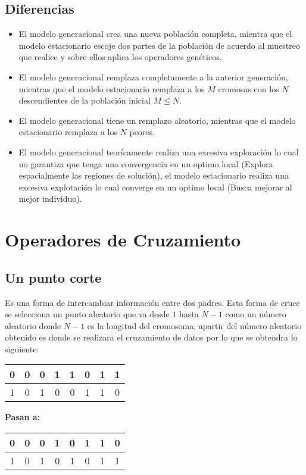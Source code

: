 \documentclass[10pt]{article}
\begin{document}
\subsection{Diferencias}
\begin{itemize}
  \item El modelo generacional crea una nueva población completa, mientra que el modelo estacionario escoje dos partes de la población de acuerdo al muestreo que realice y sobre ellos aplica los operadores genéticos.
  \item El modelo generacional remplaza completamente a la anterior generación, mientras que el modelo estacionario remplaza a los $M$ cromosas con los $N$ descendientes de la población inicial $M\leq N$.
  \item El modelo generacional tiene un remplazo aleatorio, mientras que el modelo estacionario remplaza a los $N$ peores.
  \item El modelo generacional teorícamente realiza una excesiva exploración lo cual no garantiza que tenga una convergencia en un optimo local (Explora espacialmente las regiones de solución), el modelo estacionario realiza una excesiva explotación lo cual converge en un optimo local (Busca mejorar al mejor individuo).
\end{itemize}
\section{Operadores de Cruzamiento}
\subsection{Un punto corte}
Es una forma de intercambiar información entre dos padres. Esta forma de cruce se selecciona un punto aleatorio que va desde $1$ hasta $N-1$ como un número aleatorio donde $N-1$ es la longitud del cromosoma, apartir del número aleatorio obtenido es donde se realizara el cruzamiento de datos por lo que se obtendra lo siguiente:
\begin{center}
  \begin{tabular}{|c|c|c|c|c|c|c|c|}
    \hline
    \color{green}0&\color{green}0&\color{green}0&\color{green}1&\color{blue}1&\color{blue}0&\color{blue}1&\color{blue}1\\
    \hline
    \color{red}1&\color{red}0&\color{red}1&\color{red}0&\color{yellow}0&\color{yellow}1&\color{yellow}1&\color{yellow}0\\
    \hline
  \end{tabular}
  \textbf{Pasan a:}
  \begin{tabular}{|c|c|c|c|c|c|c|c|}
    \hline
    \color{green}0&\color{green}0&\color{green}0&\color{green}1&\color{yellow}0&\color{yellow}1&\color{yellow}1&\color{yellow}0\\
    \hline
    \color{red}1&\color{red}0&\color{red}1&\color{red}0&\color{blue}1&\color{blue}0&\color{blue}1&\color{blue}1\\
    \hline
  \end{tabular}
\end{center}
\end{document}
